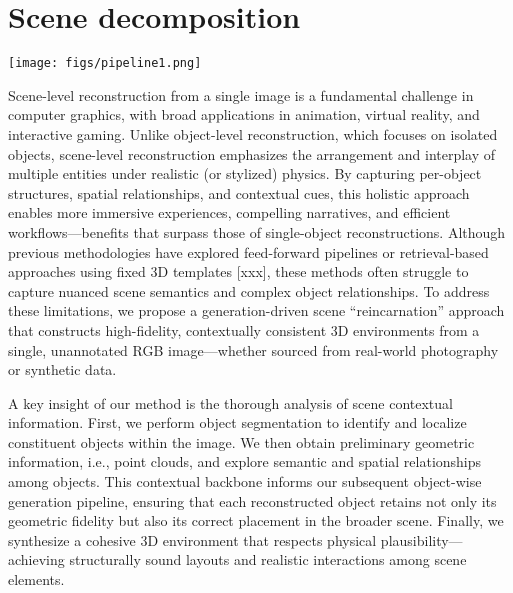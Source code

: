 \section{Scene decomposition}

\begin{figure*} [ht]
  \centering
  \texttt{[image: figs/pipeline1.png]}
   \label{fig_overview1}
\end{figure*}

Scene-level reconstruction from a single image is a fundamental challenge in computer graphics, with broad applications in animation, virtual reality, and interactive gaming. Unlike object-level reconstruction, which focuses on isolated objects, scene-level reconstruction emphasizes the arrangement and interplay of multiple entities under realistic (or stylized) physics. By capturing per-object structures, spatial relationships, and contextual cues, this holistic approach enables more immersive experiences, compelling narratives, and efficient workflows—benefits that surpass those of single-object reconstructions. Although previous methodologies have explored feed-forward pipelines or retrieval-based approaches using fixed 3D templates [xxx], these methods often struggle to capture nuanced scene semantics and complex object relationships. To address these limitations, we propose a generation-driven scene “reincarnation” approach that constructs high-fidelity, contextually consistent 3D environments from a single, unannotated RGB image—whether sourced from real-world photography or synthetic data.

A key insight of our method is the thorough analysis of scene contextual information. First, we perform object segmentation to identify and localize constituent objects within the image. We then obtain preliminary geometric information, i.e., point clouds, and explore semantic and spatial relationships among objects. This contextual backbone informs our subsequent object-wise generation pipeline, ensuring that each reconstructed object retains not only its geometric fidelity but also its correct placement in the broader scene. Finally, we synthesize a cohesive 3D environment that respects physical plausibility—achieving structurally sound layouts and realistic interactions among scene elements.

